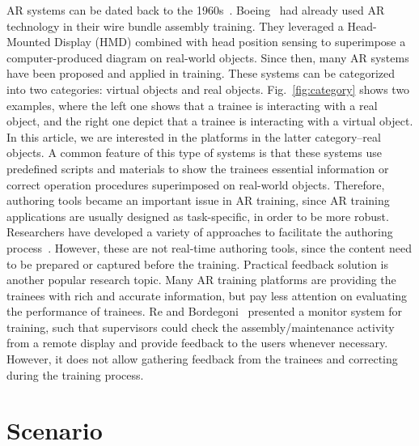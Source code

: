 AR systems can be dated back to the 1960s~\cite{sutherland1968,johnson2010, yuen2011}. Boeing~\cite{caudell1992} had already used AR technology in their wire bundle assembly training. They leveraged a Head-Mounted Display (HMD) combined with head position sensing to superimpose a computer-produced diagram on real-world objects. Since then, many AR systems have been proposed and applied in training. These systems can be categorized into two categories: virtual objects and real objects. Fig.~\ref{fig:category} shows two examples, where the left one shows that a trainee is interacting with a real object, and the right one depict that a trainee is interacting with a virtual object. In this article, we are interested in the platforms in the latter category--real objects. A common feature of this type of systems is that these systems use predefined scripts and materials to show the trainees essential information or correct operation procedures superimposed on real-world objects.
Therefore, authoring tools became an important issue in AR training, since AR training applications are usually designed as task-specific, in order to be more robust.
Researchers have developed a variety of approaches to facilitate the authoring process~\cite{wang2010,petersen2012,anderson2013,bhattacharya2015}.
However, these are not real-time authoring tools, since the content need to be prepared or captured before the training.
Practical feedback solution is another popular research topic. Many AR training platforms are providing the trainees with rich and accurate information, but pay less attention on evaluating the performance of trainees. Re and Bordegoni~\cite{re2014} presented a monitor system for training, such that supervisors could check the assembly/maintenance activity from a remote display and provide feedback to the users whenever necessary. However, it does not allow gathering feedback from the trainees and correcting during the training process.

\section{Scenario}
\label{sec:i:s}

